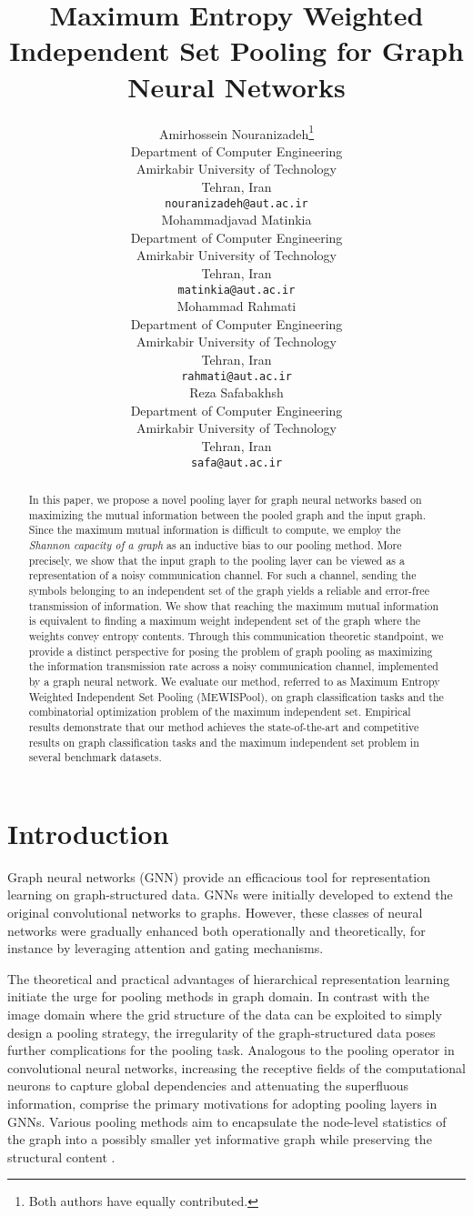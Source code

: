 \documentclass{article}
\title{Maximum Entropy Weighted Independent Set Pooling for Graph Neural Networks}
\author{Amirhossein Nouranizadeh\thanks{Both authors have equally contributed.} \\
  Department of Computer Engineering\\
  Amirkabir University of Technology\\
  Tehran, Iran \\
  \texttt{nouranizadeh@aut.ac.ir} \\
\And
  Mohammadjavad Matinkia\footnotemark[1] \\
  Department of Computer Engineering\\
  Amirkabir University of Technology\\
  Tehran, Iran \\
  \texttt{matinkia@aut.ac.ir} \\
  \And
  Mohammad Rahmati\\
  Department of Computer Engineering\\
  Amirkabir University of Technology\\
  Tehran, Iran \\
  \texttt{rahmati@aut.ac.ir} \\
  \And
  Reza Safabakhsh\\
Department of Computer Engineering\\
  Amirkabir University of Technology\\
  Tehran, Iran \\
  \texttt{safa@aut.ac.ir} \\
}
\begin{document}
\maketitle

\begin{abstract}
  In this paper, we propose a novel pooling layer for graph neural networks based on maximizing the mutual information between the pooled graph and the input graph. Since the maximum mutual information is difficult to compute, we employ the \textit{Shannon capacity of a graph} as an inductive bias to our pooling method.
  More precisely, we show that the input graph to the pooling layer can be viewed as a representation of a noisy communication channel.
  For such a channel, sending the symbols belonging to an independent set of the graph yields a reliable and error-free transmission of information.  
  We show that reaching the maximum mutual information is equivalent to finding a maximum weight independent set of the graph where the weights convey entropy contents.
  Through this communication theoretic standpoint, we provide a distinct perspective for posing the problem of graph pooling as maximizing the information transmission rate across a noisy communication channel, implemented by a graph neural network.
  We evaluate our method, referred to as Maximum Entropy Weighted Independent Set Pooling (MEWISPool), on graph classification tasks and the combinatorial optimization problem of the maximum independent set. Empirical results demonstrate that our method achieves the state-of-the-art and competitive results on graph classification tasks and the maximum independent set problem in several benchmark datasets.
\end{abstract}

\section{Introduction}
\label{sec:intro}
Graph neural networks (GNN) provide an efficacious tool for representation learning on graph-structured data. GNNs were initially developed to extend the original convolutional networks to graphs. However, these classes of neural networks were gradually enhanced both operationally and theoretically, for instance by leveraging attention and gating mechanisms\cite{benchmarking}.

The theoretical and practical advantages of hierarchical representation learning initiate the urge for pooling methods in graph domain. In contrast with the image domain where the grid structure of the data can be exploited to simply design a pooling strategy, the irregularity of the graph-structured data poses further complications for the pooling task. Analogous to the pooling operator in convolutional neural networks, increasing the receptive fields of the computational neurons to capture global dependencies and attenuating the superfluous information, comprise the primary motivations for adopting pooling layers in GNNs. Various pooling methods aim to encapsulate the node-level statistics of the graph into a possibly smaller yet informative graph while preserving the structural content \cite{hamilton}.
\end{document}
